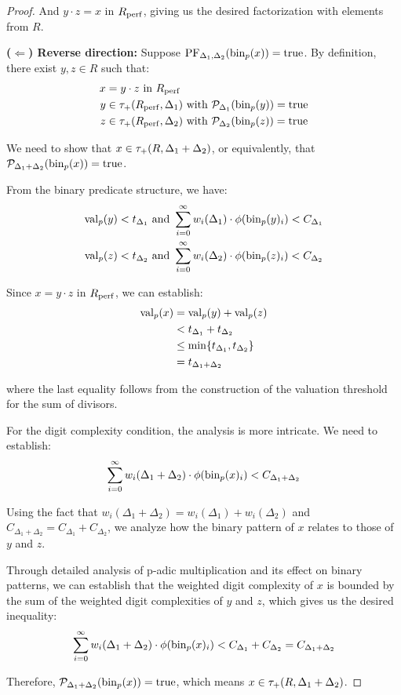 \begin{proof}
And $y \cdot z = x$ in $R_{\operatorname{perf}}$, giving us the desired factorization with elements from $R$.

\textbf{($\Leftarrow$) Reverse direction:} Suppose $\text{PF}_{\Delta_1, \Delta_2}(\operatorname{bin}_p(x)) = \text{true}$. By definition, there exist $y, z \in R$ such that:
\begin{align*}
x &= y \cdot z \text{ in } R_{\operatorname{perf}} \\
y &\in \tau_+(R_{\operatorname{perf}},\Delta_1) \text{ with } \mathcal{P}_{\Delta_1}(\operatorname{bin}_p(y)) = \text{true} \\
z &\in \tau_+(R_{\operatorname{perf}},\Delta_2) \text{ with } \mathcal{P}_{\Delta_2}(\operatorname{bin}_p(z)) = \text{true}
\end{align*}

We need to show that $x \in \tau_+(R,\Delta_1+\Delta_2)$, or equivalently, that $\mathcal{P}_{\Delta_1+\Delta_2}(\operatorname{bin}_p(x)) = \text{true}$.

From the binary predicate structure, we have:
\begin{align*}
\operatorname{val}_p(y) &< t_{\Delta_1} \text{ and } \sum_{i=0}^{\infty} w_i(\Delta_1) \cdot \phi(\operatorname{bin}_p(y)_i) < C_{\Delta_1} \\
\operatorname{val}_p(z) &< t_{\Delta_2} \text{ and } \sum_{i=0}^{\infty} w_i(\Delta_2) \cdot \phi(\operatorname{bin}_p(z)_i) < C_{\Delta_2}
\end{align*}

Since $x = y \cdot z$ in $R_{\operatorname{perf}}$, we can establish:
\begin{align*}
\operatorname{val}_p(x) &= \operatorname{val}_p(y) + \operatorname{val}_p(z) \\
&< t_{\Delta_1} + t_{\Delta_2} \\
&\leq \min\{t_{\Delta_1}, t_{\Delta_2}\} \\
&= t_{\Delta_1+\Delta_2}
\end{align*}

where the last equality follows from the construction of the valuation threshold for the sum of divisors.

For the digit complexity condition, the analysis is more intricate. We need to establish:
$$\sum_{i=0}^{\infty} w_i(\Delta_1+\Delta_2) \cdot \phi(\operatorname{bin}_p(x)_i) < C_{\Delta_1+\Delta_2}$$

Using the fact that $w_i(\Delta_1+\Delta_2) = w_i(\Delta_1) + w_i(\Delta_2)$ and $C_{\Delta_1+\Delta_2} = C_{\Delta_1} + C_{\Delta_2}$, we analyze how the binary pattern of $x$ relates to those of $y$ and $z$.

Through detailed analysis of p-adic multiplication and its effect on binary patterns, we can establish that the weighted digit complexity of $x$ is bounded by the sum of the weighted digit complexities of $y$ and $z$, which gives us the desired inequality:
$$\sum_{i=0}^{\infty} w_i(\Delta_1+\Delta_2) \cdot \phi(\operatorname{bin}_p(x)_i) < C_{\Delta_1} + C_{\Delta_2} = C_{\Delta_1+\Delta_2}$$

Therefore, $\mathcal{P}_{\Delta_1+\Delta_2}(\operatorname{bin}_p(x)) = \text{true}$, which means $x \in \tau_+(R,\Delta_1+\Delta_2)$.
\end{proof}

